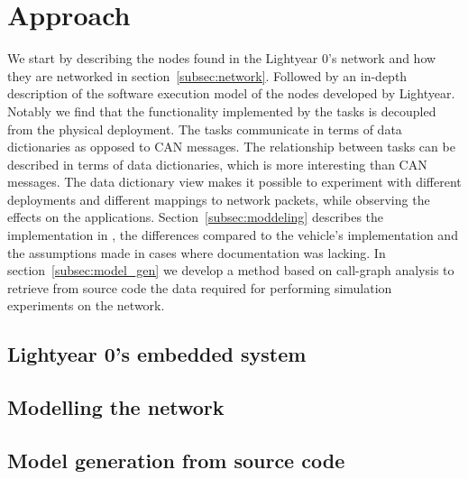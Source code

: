 \section{Approach}
\label{sec:approach}
We start by describing the nodes found in the Lightyear 0's network and how they are networked in section~\ref{subsec:network}. Followed by an in-depth description of the software execution model of the nodes developed by Lightyear. Notably we find that the functionality implemented by the tasks is decoupled from the physical deployment. The tasks communicate in terms of data dictionaries as opposed to CAN messages. The relationship between tasks can be described in terms of data dictionaries, which is more interesting than CAN messages. The data dictionary view makes it possible to experiment with different deployments and different mappings to network packets, while observing the effects on the applications. Section~\ref{subsec:moddeling} describes the implementation in \omnet, the differences compared to the vehicle's implementation and the assumptions made in cases where documentation was lacking. In section~\ref{subsec:model_gen} we develop a method based on call-graph analysis to retrieve from source code the data required for performing simulation experiments on the network.

\subsection{Lightyear 0's embedded system}


\subsection{Modelling the network}


\subsection{Model generation from source code}
